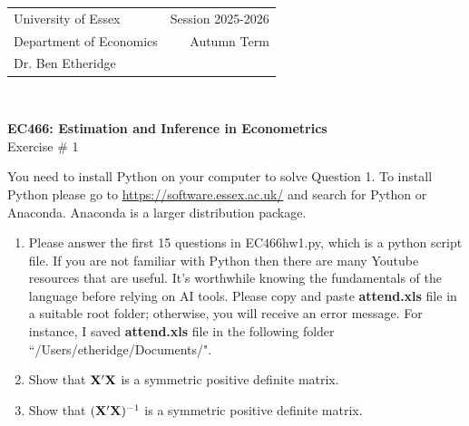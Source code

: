 \documentclass[12pt,a4paper]{article}
\begin{document}
\begin{tabular}{l r}
University of Essex  \hspace{35ex}& Session 2025-2026 \\
Department of Economics \hspace{35ex} & Autumn Term\\
Dr. Ben Etheridge \hspace{35ex} &
\end{tabular}
\\
\begin{center}
\large{\textbf{EC466: Estimation and Inference in Econometrics}\\
Exercise \# 1}
\end{center}
\vspace*{0.5cm}
You need to install Python on your computer to solve Question 1. To install Python please go to \url{https://software.essex.ac.uk/} and search for Python or Anaconda. Anaconda is a larger distribution package.

\begin{enumerate}
\item{Please answer the first 15 questions in EC$466$hw1.py, which is a python script file. If you are not familiar with Python then there are many Youtube resources that are useful. It's worthwhile knowing the fundamentals of the language before relying on AI tools. Please copy and paste {\bf attend.xls} file in a suitable root folder; otherwise, you will receive an {\color{red}error message}. For instance, I saved {\bf attend.xls} file in the following folder ``/Users/etheridge/Documents/".}
\item{Show that ${\bf X'X}$ is a symmetric positive definite matrix.}
\item{Show that $({\bf X'X})^{-1}$ is a symmetric positive definite matrix.}
\vspace*{0.5cm}
\end{enumerate}
\end{document}
